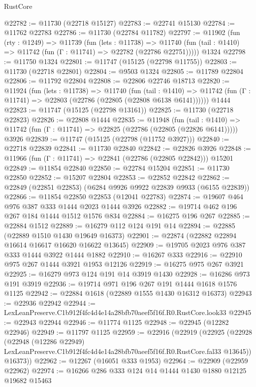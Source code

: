 \begin{lexlean}{RustCore}
\begin{coremodule}
@22782 := @11730 (@22718 @15127)
@22783 := @22741 @15130
@22784 := @11762 @22783
@22786 := @11730 (@22784 @11782)
@22797 := @11902
    (fun (rty : @1249) =>
    @11739
      (fun (lets : @11738) =>
      @11740 (fun (tail : @1410) => @11742 (fun (Γ : @11741) => @22782 (@22786 @22751)))))
    @1324
@22798 := @11750 @1324
@22801 := @11747 (@15125 (@22798 @11755))
@22803 := @11730 (@22718 @22801)
@22804 := @9503 @1324
@22805 := @11789 @22804
@22806 := @11792 @22804
@22808 := @22806 @22746 @18713
@22820 := @11924
    (fun (lets : @11738) =>
    @11740
      (fun (tail : @1410) =>
      @11742 (fun (Γ : @11741) => @22803 (@22786 (@22805 (@22808 @6138 @6141))))))
    @1444
@22823 := @11747 (@15125 (@22798 @13161))
@22825 := @11730 (@22718 @22823)
@22826 := @22808 @1444
@22835 := @11948
    (fun (tail : @1410) => @11742 (fun (Γ : @11741) => @22825 (@22786 (@22805 (@22826 @6141)))))
    @3926
@22839 := @11747 (@15125 (@22798 (@11752 @3927)))
@22840 := @22718 @22839
@22841 := @11730 @22840
@22842 := @22826 @3926
@22848 := @11966 (fun (Γ : @11741) => @22841 (@22786 (@22805 @22842))) @15201
@22849 := @11854 @22840
@22850 := @22784 @15204
@22851 := @11730 @22850
@22852 := @15207 @22804
@22853 := @22852 @22842
@22862 := @22849 (@22851 @22853) (@6284 @9926 @9922 @22839 @9933 (@6155 @22839))
@22866 := @11854 @22850 @22853 (@12041 @22783)
@22874 := @19607 @464 @976 @387 @333 @1444 @2023 @1444 @3926
@22882 := @19714 @462 @196 @267 @184 @1444 @1512 @1576 @834
@22884 := @16275 @196 @267
@22885 := @22884 @1512
@22889 := @16279 @112 @124 @191 @14
@22894 := @22885 (@22889 @1510 @1430 @19649 @16373)
@22901 := @22874 (@22882 @22894 @16614 @16617 @16620 @16622 @13645)
@22909 := @19705 @2023 @976 @387 @333 @1444 @3922 @1444 @1882
@22910 := @16267 @333
@22916 := @22910 @975 @267 @1444 @3921 @1953 @12126
@22919 := @16275 @975 @267 @3921
@22925 := @16279 @973 @124 @191 @14 @3919 @1430
@22928 := @16286 @973 @191 @3919
@22936 := @19714 @971 @196 @267 @191 @1444 @1618 @1576 @1125
@22942 := @22884 @1618 (@22889 @1555 @1430 @16312 @16373)
@22943 := @22936 @22942
@22944 := LexLeanPreserve.C1b912f4fc4d4e14a28bfb70aeef5f16f.R0.RustCore.look33
@22945 := @22943 @22944
@22946 := @11774 @1125
@22948 := @22945 (@12282 @22946)
@22949 := @11797 @1125
@22959 := @22916
    (@22919
      (@22925
        (@22928
          (@22948
            (@12286 @22949)
            LexLeanPreserve.C1b912f4fc4d4e14a28bfb70aeef5f16f.R0.RustCore.fal33
            @13645))
        @16373))
@22962 := @12267 (@16051 @333 @1953)
@22964 := @22909 (@22959 @22962)
@22974 := @16266 @286 @333 @124 @14 @1444 @1430 @1880 @12125 @19682 @15463

\end{coremodule}
\end{lexlean}
